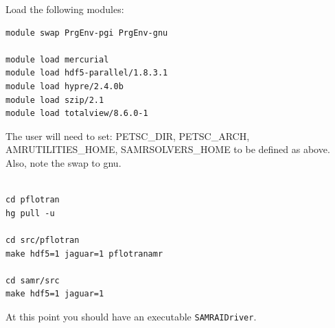 \documentclass[12pt]{article}
\begin{document}
\noindent
Load the following modules:
\begin{verbatim}
module swap PrgEnv-pgi PrgEnv-gnu
 
module load mercurial
module load hdf5-parallel/1.8.3.1
module load hypre/2.4.0b
module load szip/2.1
module load totalview/8.6.0-1
\end{verbatim}


\noindent
The user will need to set: PETSC\_DIR, PETSC\_ARCH, AMRUTILITIES\_HOME, SAMRSOLVERS\_HOME
to be defined as above. Also, note the swap to gnu.
\begin{verbatim}
 
cd pflotran
hg pull -u

cd src/pflotran
make hdf5=1 jaguar=1 pflotranamr

cd samr/src
make hdf5=1 jaguar=1
\end{verbatim}
At this point you should have an executable \verb|SAMRAIDriver|.
 

 
\end{document}
